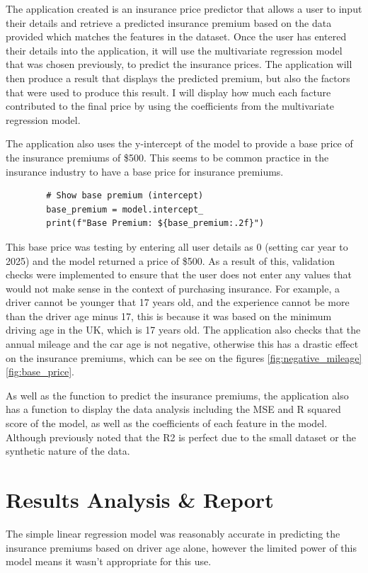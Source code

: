 \documentclass{article}
\begin{document}
The application created is an insurance price predictor that allows a user to input their details and retrieve a predicted insurance premium based on the data provided which matches the features in the dataset. Once the user has entered their details into the application, it will use the multivariate regression model that was chosen previously, to predict the insurance prices. The application will then produce a result that displays the predicted premium, but also the factors that were used to produce this result. I will display how much each facture contributed to the final price by using the coefficients from the multivariate regression model. 

The application also uses the y-intercept of the model to provide a base price of the insurance premiums of \$500. This seems to be common practice in the insurance industry to have a base price for insurance premiums. 
\begin{verbatim}
        # Show base premium (intercept)
        base_premium = model.intercept_
        print(f"Base Premium: ${base_premium:.2f}")
\end{verbatim}
This base price was testing by entering all user details as 0 (setting car year to 2025) and the model returned a price of \$500. As a result of this, validation checks were implemented to ensure that the user does not enter any values that would not make sense in the context of purchasing insurance. For example, a driver cannot be younger that 17 years old, and the experience cannot be more than the driver age minus 17, this is because it was based on the minimum driving age in the UK, which is 17 years old. The application also checks that the annual mileage and the car age is not negative, otherwise this has a drastic effect on the insurance premiums, which can be see on the figures \ref{fig:negative_mileage} \ref{fig:base_price}. 


As well as the function to predict the insurance premiums, the application also has a function to display the data analysis including the MSE and R squared score of the model, as well as the coefficients of each feature in the model. Although previously noted that the R2 is perfect due to the small dataset or the synthetic nature of the data. 

\section{Results Analysis \& Report}

The simple linear regression model was reasonably accurate in predicting the insurance premiums based on driver age alone, however the limited power of this model means it wasn't appropriate for this use. 
\end{document}
